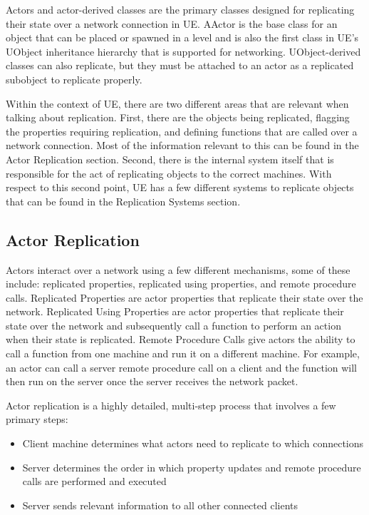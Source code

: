 \documentclass[
  letterpaper,
  DIV=11,
  numbers=noendperiod]{scrartcl}
\providecommand{\tightlist}{%
  \setlength{\itemsep}{0pt}\setlength{\parskip}{0pt}}
\begin{document}
Actors and actor-derived classes are the primary classes designed for
replicating their state over a network connection in UE. AActor is the
base class for an object that can be placed or spawned in a level and is
also the first class in UE's UObject inheritance hierarchy that is
supported for networking. UObject-derived classes can also replicate,
but they must be attached to an actor as a replicated subobject to
replicate properly.

Within the context of UE, there are two different areas that are
relevant when talking about replication. First, there are the objects
being replicated, flagging the properties requiring replication, and
defining functions that are called over a network connection. Most of
the information relevant to this can be found in the Actor Replication
section. Second, there is the internal system itself that is responsible
for the act of replicating objects to the correct machines. With respect
to this second point, UE has a few different systems to replicate
objects that can be found in the Replication Systems section.

\subsection{Actor Replication}\label{actor-replication}

Actors interact over a network using a few different mechanisms, some of
these include: replicated properties, replicated using properties, and
remote procedure calls. Replicated Properties are actor properties that
replicate their state over the network. Replicated Using Properties are
actor properties that replicate their state over the network and
subsequently call a function to perform an action when their state is
replicated. Remote Procedure Calls give actors the ability to call a
function from one machine and run it on a different machine. For
example, an actor can call a server remote procedure call on a client
and the function will then run on the server once the server receives
the network packet.

Actor replication is a highly detailed, multi-step process that involves
a few primary steps:

\begin{itemize}
\tightlist
\item
  Client machine determines what actors need to replicate to which
  connections
\item
  Server determines the order in which property updates and remote
  procedure calls are performed and executed
\item
  Server sends relevant information to all other connected clients
\end{itemize}
\end{document}

